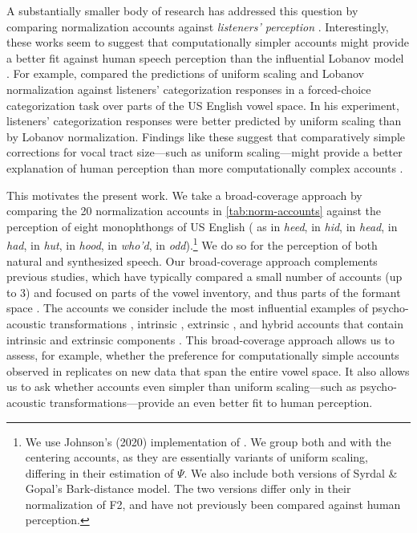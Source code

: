 \documentclass[preprint]{JASA}
\begin{document}
A substantially smaller body of research has addressed this question by comparing normalization accounts against \emph{listeners' perception} \citetext{\citealp{barreda-nearey2012}; \citealp{barreda2021}; \citealp{nearey1989}; \citealp{richter2017}; \citealp[for a review, see][]{whalen2016}}. Interestingly, these works seem to suggest that computationally simpler accounts might provide a better fit against human speech perception than the influential Lobanov model \citep{barreda2021, richter2017}. For example, \citet{barreda2021} compared the predictions of uniform scaling and Lobanov normalization against listeners' categorization responses in a forced-choice categorization task over parts of the US English vowel space. In his experiment, listeners' categorization responses were better predicted by uniform scaling than by Lobanov normalization. Findings like these suggest that comparatively simple corrections for vocal tract size---such as uniform scaling---might provide a better explanation of human perception than more computationally complex accounts \citep[see also][]{johnson2020, richter2017}.

This motivates the present work. We take a broad-coverage approach by
comparing the 20 normalization accounts in %
\ref{tab:norm-accounts} against the perception of eight monophthongs
of US English (\textipa{[i]} as in \emph{heed}, \textipa{[I]} in
\emph{hid}, \textipa{[E]} in \emph{head}, \textipa{[ae]} in
\emph{had}, \textipa{[2]} in \emph{hut}, \textipa{[U]} in \emph{hood},
\textipa{[u]} in \emph{who'd}, \textipa{[A]} in
\emph{odd}).\footnote{We use Johnson's (2020) implementation of
\citet{nordstrom-lindblom1975}. We group both
\citet{nordstrom-lindblom1975} and \citet{johnson2020} with the
centering accounts, as they are essentially variants of uniform
scaling, differing in their estimation of \(\Psi\). We also include
both versions of Syrdal \& Gopal's Bark-distance model. The two
versions differ only in their normalization of F2, and have not
previously been compared against human perception.} We do so for the
perception of both natural and synthesized speech. Our broad-coverage
approach complements previous studies, which have typically compared a
small number of accounts (up to 3) and focused on parts of the vowel
inventory, and thus parts of the formant space \citep[typically 2-4
vowels,][]{barreda-nearey2012, barreda2021, nearey1989, richter2017}.
The accounts we consider include the most influential examples of
psycho-acoustic transformations \citep{glasberg-moore1990, fant2002,
stevens-volkmann1940, traunmuller1981}, intrinsic
\citep{syrdal-gopal1986}, extrinsic \citep{gerstman1968, johnson2020,
lobanov1971, mcmurray-jongman2011, nearey1978,
nordstrom-lindblom1975}, and hybrid accounts that contain intrinsic
and extrinsic components \citep{miller1989}. This broad-coverage
approach allows us to assess, for example, whether the preference for
computationally simple accounts observed in \citet{barreda2021}
replicates on new data that span the entire vowel space. It also
allows us to ask whether accounts even simpler than uniform
scaling---such as psycho-acoustic transformations---provide an even
better fit to human perception.
\end{document}
